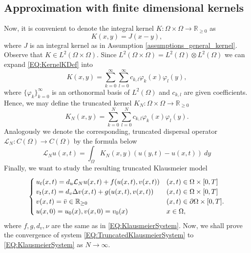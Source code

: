 \documentclass[12pt, a4paper]{article}
\theoremstyle{break}
\theoremstyle{break}
\theoremstyle{break}
\theoremstyle{break}
\theoremstyle{break}
\theoremstyle{break}
\theoremstyle{break}
\begin{document}
\subsection{Approximation with finite dimensional kernels}
Now, it is convenient to denote the integral kernel $K: \Omega \times \Omega \rightarrow \mathbb{R}_{\geq 0}$ as
\begin{equation}
    \label{EQ:KernelKDef}
    K(x, y) = J(x-y),
\end{equation}
where $J$ is an integral kernel as in Assumption \ref{assumptions_general_kernel}. Observe that $K \in L^2(\Omega \times \Omega)$. Since $L^2(\Omega \times \Omega) = L^2(\Omega) \otimes L^2(\Omega)$ we can expand \eqref{EQ:KernelKDef} into
\begin{equation*}
    K(x, y) = \sum_{k=0}^\infty \sum_{l=0}^\infty c_{k, l} \varphi_k(x) \varphi_l(y),
\end{equation*}
where $\{\varphi_k\}_{k=0}^\infty$ is an orthonormal basis of $L^2(\Omega)$ and $c_{k,l}$ are given coefficients. Hence, we may define the truncated kernel $K_N : \Omega \times \Omega \rightarrow \mathbb{R}_{\geq 0}$
\begin{equation}
    \label{EQ:TruncatedKernelKDef}
    K_N(x, y) = \sum_{k=0}^N \sum_{l=0}^N c_{k, l} \varphi_k(x) \varphi_l(y).
\end{equation}
Analogously we denote the corresponding, truncated dispersal operator $\mathcal{L}_N: C(\Omega) \rightarrow C(\Omega)$ by the formula below
\begin{equation}
    \label{EQ:TruncatedDispersalOperatorDef}
    \mathcal{L}_N u(x, t) = \int_\Omega K_N(x,y) \left(u(y,t) - u(x,t) \right)\:dy
\end{equation}
Finally, we want to study the resulting truncated Klausmeier model
\begin{align}
    \label{EQ:TruncatedKlausmeierSystem}
    \begin{cases}
        u_t(x,t) = d_u\mathcal{L}_N u(x, t) + f(u(x,t), v(x,t)) &(x, t) \in \Omega \times [0, T] \\
        v_t(x,t) = d_v\Delta v(x,t) + g(u(x,t), v(x,t)) &(x, t) \in \Omega \times [0, T] \\
        v(x,t) = \Bar{v} \in \mathbb{R}_{\geq 0} &(x, t) \in \partial\Omega \times [0, T]. \\
        u(x,0) = u_0(x), v(x,0) = v_0(x) &x \in \Omega,
    \end{cases}
\end{align}
where $f, g, d_v, \nu$ are the same as in \eqref{EQ:KlausmeierSystem}. Now, we shall prove the convergence of system \eqref{EQ:TruncatedKlausmeierSystem} to \eqref{EQ:KlausmeierSystem} as $N \rightarrow \infty$.
\end{document}
